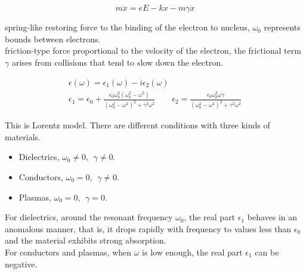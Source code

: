 \documentclass{article}
\begin{document}
			\begin{equation}
				m\ddot{x} = eE - kx - m\gamma\dot{x}
			\end{equation}

			spring-like restoring force to the binding of the electron to nucleus, $\omega_{0}$ represents bounds between electrons.\\
			friction-type force proportional to the velocity of the electron, the frictional term $\gamma$ arises from collisions that tend to slow down the
			electron.

			\begin{equation}
			\begin{aligned}
				\epsilon(\omega) = \epsilon_{1}(\omega) - i\epsilon_{2}(\omega)\\
				\epsilon_{1} = \epsilon_{0} + \frac{\epsilon_{0}\omega_{p}^{2}(\omega_{0}^{2} - \omega^{2})}{(\omega_{0}^{2} - \omega^{2})^{2} + \gamma^{2}\omega^{2}} \ \ \ \ \ \ \ \ \ \epsilon_{2} = \frac{\epsilon_{0}\omega_{p}^{2}\omega\gamma}{(\omega_{0}^{2} - \omega^{2})^{2} + \gamma^{2}\omega^{2}}
			\end{aligned}
			\end{equation}

			This is Lorentz model. There are different conditions with three kinds of materials.

			\begin{itemize}
				\item Dielectrics, $\omega_{0} \neq 0,\ \ \gamma \neq 0.$
				\item Conductors, $\omega_{0} = 0,\ \ \gamma \neq 0.$
				\item Plasmas, $\omega_{0} = 0,\ \ \gamma = 0.$
			\end{itemize}

			For dielectrics, around the resonant frequency $\omega_{0}$, the real part $\epsilon_{1}$ behaves in an anomalous manner, that is, it drops rapidly with frequency to values less than $\epsilon_{0}$ and the material exhibits strong absorption.\\

			For conductors and plasmas, when $\omega$ is low enough, the real part $\epsilon_{1}$ can be negative.
\end{document}
